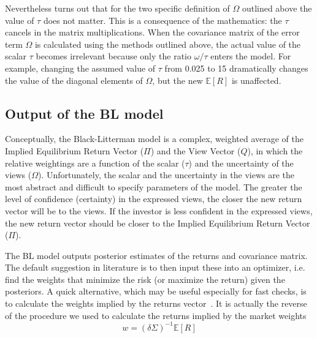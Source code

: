 
Nevertheless turns out that for the two specific definition of $\Omega$ outlined above the value of $\tau$ does not matter. This is a consequence of the mathematics: the $\tau$ cancels in the matrix multiplications.
When the covariance matrix of the error term $\Omega$ is calculated using the methods outlined above, the actual value of the scalar $\tau$ becomes irrelevant because only the ratio $\omega/\tau$ enters the model. For example, changing the assumed value of $\tau$ from 0.025 to 15 dramatically changes the value of the diagonal elements of $\Omega$, but the new $\mathbb{E}[R]$ is unaffected.

\subsection{Output of the BL model}
Conceptually, the Black-Litterman model is a complex, weighted average of the Implied Equilibrium Return Vector ($\Pi$) and the View Vector ($Q$), in which the relative weightings are a function of the scalar ($\tau$) and the uncertainty of the views ($\Omega$).
Unfortunately, the scalar and the uncertainty in the views are the most abstract and difficult to specify parameters of the model. The greater the level of confidence (certainty) in the expressed views, the closer the new return vector will be to the views.
If the investor is less confident in the expressed views, the new return vector should be closer to the Implied Equilibrium Return Vector ($\Pi$).

The BL model outputs posterior estimates of the returns and covariance matrix. The default suggestion in literature is to then input these into an optimizer, i.e. find the weights that minimize the risk (or maximize the return) given the posteriors. A quick alternative, which may be useful especially for fast checks, is to calculate the weights implied by the returns vector~\cite{bib:walters}. 
It is actually the reverse of the procedure we used to calculate the returns implied by the market weights
\begin{equation}
w = (\delta\Sigma)^{-1}\mathbb{E}[R]
\end{equation}

